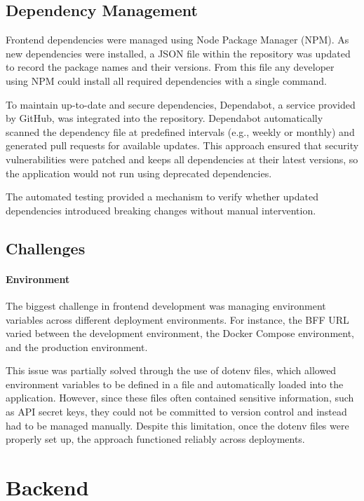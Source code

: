 \subsection{Dependency Management}
Frontend dependencies were managed using Node Package Manager (NPM). As new dependencies were installed, a JSON file within the repository was updated to record the package names and their versions. From this file any developer using NPM could install all required dependencies with a single command.

To maintain up-to-date and secure dependencies, Dependabot, a service provided by GitHub, was integrated into the repository. Dependabot automatically scanned the dependency file at predefined intervals (e.g., weekly or monthly) and generated pull requests for available updates. This approach ensured that security vulnerabilities were patched and keeps all dependencies at their latest versions, so the application would not run using deprecated dependencies.

The automated testing provided a mechanism to verify whether updated dependencies introduced breaking changes without manual intervention.

\subsection{Challenges}
\paragraph{Environment}
The biggest challenge in frontend development was managing environment variables across different deployment environments. For instance, the BFF URL varied between the development environment, the Docker Compose environment, and the production environment.

This issue was partially solved through the use of dotenv files, which allowed environment variables to be defined in a file and automatically loaded into the application. However, since these files often contained sensitive information, such as API secret keys, they could not be committed to version control and instead had to be managed manually. Despite this limitation, once the dotenv files were properly set up, the approach functioned reliably across deployments.

\section{Backend}~\label{sec:backend-development}

